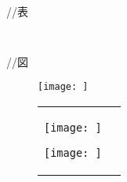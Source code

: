 //表

\begin{table}[!ht]
  \caption{}
  \label{}
  \begin{center}
    \begin{tabular}{}
    \end{tabular}
  \end{center}
\end{table}%

//図

\begin{figure}[!ht]
  \centering
  \texttt{[image: ]}
  \caption{}
  \label{}
\end{figure}%


\begin{figure}[!ht]
  \begin{tabular}{cc}
    \begin{minipage}{0.5\hsize}
      \begin{center}
        \texttt{[image: ]}
        \caption{}
        \label{}
      \end{center}
    \end{minipage}
    \begin{minipage}{0.5\hsize}
      \begin{center}
        \texttt{[image: ]}
        \caption{}
        \label{}
      \end{center}
    \end{minipage}
  \end{tabular}
\end{figure}%
